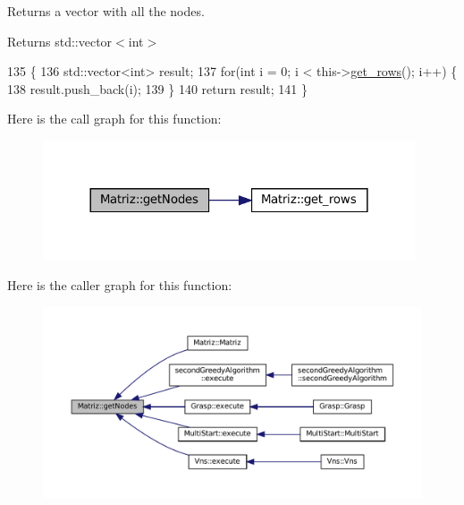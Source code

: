 Returns a vector with all the nodes. 

\begin{DoxyReturn}{Returns}
std\+::vector$<$int$>$ 
\end{DoxyReturn}

\begin{DoxyCode}
135                                 \{
136   std::vector<int> result;
137   \textcolor{keywordflow}{for}(\textcolor{keywordtype}{int} i = 0; i < this->\hyperlink{classMatriz_a6b18342f8c083baece693ff41185a206}{get\_rows}(); i++) \{
138     result.push\_back(i);
139   \}
140   \textcolor{keywordflow}{return} result;
141 \}
\end{DoxyCode}
Here is the call graph for this function\+:\nopagebreak
\begin{figure}[H]
\begin{center}
\leavevmode
\includegraphics[width=312pt]{classMatriz_a394b84a5ec13fd2f4d202ab218680afe_cgraph}
\end{center}
\end{figure}
Here is the caller graph for this function\+:\nopagebreak
\begin{figure}[H]
\begin{center}
\leavevmode
\includegraphics[width=350pt]{classMatriz_a394b84a5ec13fd2f4d202ab218680afe_icgraph}
\end{center}
\end{figure}
\mbox{\label{classMatriz_ad2adc857ff1738ebfb7fe42de408737b}} 
